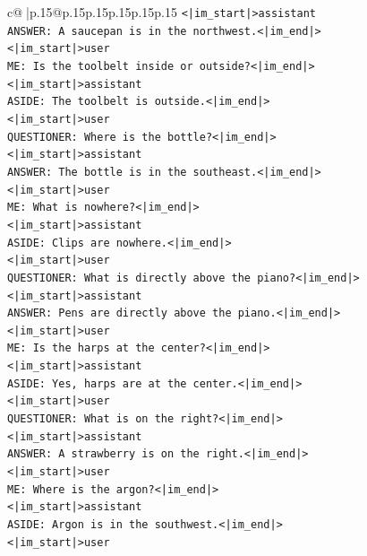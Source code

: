 \documentclass{article}
\begin{document}
{\begin{supertabular}{c@{$\;$}|p{.15\linewidth}@{}p{.15\linewidth}p{.15\linewidth}p{.15\linewidth}p{.15\linewidth}p{.15\linewidth}}
{{{\texttt{<|im\_start|>assistant} \\
\texttt{ANSWER: A saucepan is in the northwest.<|im\_end|>} \\
\texttt{<|im\_start|>user} \\
\texttt{ME: Is the toolbelt inside or outside?<|im\_end|>} \\
\texttt{<|im\_start|>assistant} \\
\texttt{ASIDE: The toolbelt is outside.<|im\_end|>} \\
\texttt{<|im\_start|>user} \\
\texttt{QUESTIONER: Where is the bottle?<|im\_end|>} \\
\texttt{<|im\_start|>assistant} \\
\texttt{ANSWER: The bottle is in the southeast.<|im\_end|>} \\
\texttt{<|im\_start|>user} \\
\texttt{ME: What is nowhere?<|im\_end|>} \\
\texttt{<|im\_start|>assistant} \\
\texttt{ASIDE: Clips are nowhere.<|im\_end|>} \\
\texttt{<|im\_start|>user} \\
\texttt{QUESTIONER: What is directly above the piano?<|im\_end|>} \\
\texttt{<|im\_start|>assistant} \\
\texttt{ANSWER: Pens are directly above the piano.<|im\_end|>} \\
\texttt{<|im\_start|>user} \\
\texttt{ME: Is the harps at the center?<|im\_end|>} \\
\texttt{<|im\_start|>assistant} \\
\texttt{ASIDE: Yes, harps are at the center.<|im\_end|>} \\
\texttt{<|im\_start|>user} \\
\texttt{QUESTIONER: What is on the right?<|im\_end|>} \\
\texttt{<|im\_start|>assistant} \\
\texttt{ANSWER: A strawberry is on the right.<|im\_end|>} \\
\texttt{<|im\_start|>user} \\
\texttt{ME: Where is the argon?<|im\_end|>} \\
\texttt{<|im\_start|>assistant} \\
\texttt{ASIDE: Argon is in the southwest.<|im\_end|>} \\
\texttt{<|im\_start|>user} \\
}}}
\end{supertabular}}
\end{document}
